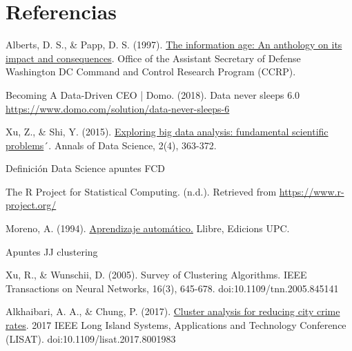 \documentclass[10pt, a4paper]{article}
\begin{document}
\renewcommand{\listfigurename}{\subsection{\textbf{Imágenes y figuras}}}
\listoffigures

\section{Referencias}
\renewcommand{\section}[2]{}
\begin{thebibliography}{X}

 Alberts, D. S., \& Papp, D. S. (1997). \href{http://www.dodccrp.org/files/Alberts_Anthology_I.pdf} {The information age: An anthology on its impact and consequences}. Office of the Assistant Secretary of Defense Washington DC Command and Control Research Program (CCRP).

 Becoming A Data-Driven CEO | Domo. (2018). Data never sleeps 6.0 \href{https://www.domo.com/solution/data-never-sleeps-6} {https://www.domo.com/solution/data-never-sleeps-6}

 Xu, Z., \& Shi, Y. (2015). \href {https://link.springer.com/content/pdf/10.1007/s40745-015-0063-7.pdf} {Exploring big data analysis: fundamental scientific problems}´. Annals of Data Science, 2(4), 363-372.

 Definición Data Science apuntes FCD

 The R Project for Statistical Computing. (n.d.). Retrieved from \href{https://www.r-project.org/} {https://www.r-project.org/}

 Moreno, A. (1994). \href{https://upcommons.upc.edu/bitstream/handle/2099.3/36157/9788483019962.pdf?sequence=1&isAllowed=y} {Aprendizaje automático.} Llibre, Edicions UPC.

 Apuntes JJ clustering

 Xu, R., \& Wunschii, D. (2005). Survey of Clustering Algorithms. IEEE Transactions on Neural Networks, 16(3), 645-678. doi:10.1109/tnn.2005.845141

 Alkhaibari, A. A., \& Chung, P. (2017). \href{https://ieeexplore.ieee.org/document/8001983} {Cluster analysis for reducing city crime rates}. 2017 IEEE Long Island Systems, Applications and Technology Conference (LISAT). doi:10.1109/lisat.2017.8001983


\end{thebibliography}
\end{document}
